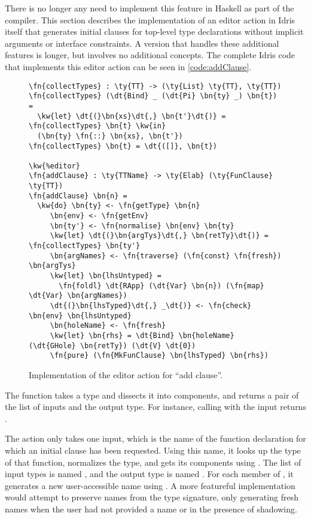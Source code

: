 There is no longer any need to implement this feature in Haskell as
part of the compiler. This section describes the implementation of an
editor action in Idris itself that generates initial clauses for top-level
type declarations without implicit arguments or interface
constraints. A version that handles these additional features is
longer, but involves no additional concepts. The complete Idris code that
implements this editor action can be seen in \autoref{code:addClause}.

\begin{figure}[ht]
\begin{Verbatim}
\fn{collectTypes} : \ty{TT} -> (\ty{List} \ty{TT}, \ty{TT})
\fn{collectTypes} (\dt{Bind} _ (\dt{Pi} \bn{ty} _) \bn{t}) =
  \kw{let} \dt{(}\bn{xs}\dt{,} \bn{t'}\dt{)} = \fn{collectTypes} \bn{t} \kw{in}
  (\bn{ty} \fn{::} \bn{xs}, \bn{t'})
\fn{collectTypes} \bn{t} = \dt{([]}, \bn{t})

\kw{%editor}
\fn{addClause} : \ty{TTName} -> \ty{Elab} (\ty{FunClause} \ty{TT})
\fn{addClause} \bn{n} =
  \kw{do} \bn{ty} <- \fn{getType} \bn{n}
     \bn{env} <- \fn{getEnv}
     \bn{ty'} <- \fn{normalise} \bn{env} \bn{ty}
     \kw{let} \dt{(}\bn{argTys}\dt{,} \bn{retTy}\dt{)} = \fn{collectTypes} \bn{ty'}
     \bn{argNames} <- \fn{traverse} (\fn{const} \fn{fresh}) \bn{argTys}
     \kw{let} \bn{lhsUntyped} =
       \fn{foldl} \dt{RApp} (\dt{Var} \bn{n}) (\fn{map} \dt{Var} \bn{argNames})
     \dt{(}\bn{lhsTyped}\dt{,} _\dt{)} <- \fn{check} \bn{env} \bn{lhsUntyped}
     \bn{holeName} <- \fn{fresh}
     \kw{let} \bn{rhs} = \dt{Bind} \bn{holeName} (\dt{GHole} \bn{retTy}) (\dt{V} \dt{0})
     \fn{pure} (\fn{MkFunClause} \bn{lhsTyped} \bn{rhs})
\end{Verbatim}
\caption{Implementation of the editor action for ``add clause''.}
\label{code:addClause}
\end{figure}

The  function takes a type and dissects it into components, and returns
a pair of the list of inputs and the output type. For instance,
calling  with the input 
returns .

The  action only takes one input, which is the name of
the function declaration for which an initial clause has been
requested.  Using this name, it looks up the type of that function,
normalizes the type, and gets its components using .
The list of input types is named , and the output type is
named . For each member of , it generates a
new user-accessible name using . A more featureful
implementation would attempt to preserve names from the type
signature, only generating fresh names when the user had not provided
a name or in the presence of shadowing.

